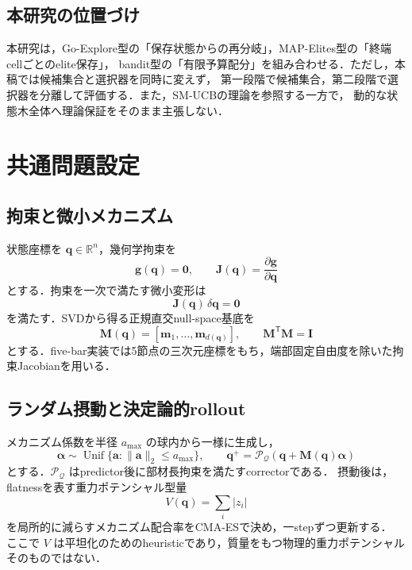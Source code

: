 \documentclass[a4paper,11pt]{ltjsarticle}
\begin{document}
\subsection{本研究の位置づけ}

本研究は，Go-Explore型の「保存状態からの再分岐」，MAP-Elites型の「終端cellごとのelite保存」，
bandit型の「有限予算配分」を組み合わせる．ただし，本稿では候補集合と選択器を同時に変えず，
第一段階で候補集合，第二段階で選択器を分離して評価する．また，SM-UCBの理論を参照する一方で，
動的な状態木全体へ理論保証をそのまま主張しない．

\section{共通問題設定}
\label{sec:formulation}

\subsection{拘束と微小メカニズム}

状態座標を \(\bm q\in\mathbb R^n\)，幾何学拘束を
\begin{equation}
  \bm g(\bm q)=\bm 0,
  \qquad
  \bm J(\bm q)=\frac{\partial\bm g}{\partial\bm q}
\end{equation}
とする．拘束を一次で満たす微小変形は
\begin{equation}
  \bm J(\bm q)\,\delta\bm q=\bm 0
\end{equation}
を満たす．SVDから得る正規直交null-space基底を
\begin{equation}
  \bm M(\bm q)
  =[\bm m_1,\ldots,\bm m_{d(\bm q)}],
  \qquad \bm M^\mathsf T\bm M=\bm I
\end{equation}
とする．five-bar実装では5節点の三次元座標をもち，端部固定自由度を除いた拘束Jacobianを用いる．

\subsection{ランダム摂動と決定論的rollout}

メカニズム係数を半径 \(a_{\max}\) の球内から一様に生成し，
\begin{equation}
  \bm\alpha\sim\operatorname{Unif}
  \{\bm a:\|\bm a\|_2\le a_{\max}\},
  \qquad
  \bm q^+=\mathcal P_{\mathcal Q}
  (\bm q+\bm M(\bm q)\bm\alpha)
  \label{eq:random-perturbation}
\end{equation}
とする．\(\mathcal P_{\mathcal Q}\) はpredictor後に部材長拘束を満たすcorrectorである．
摂動後は，flatnessを表す重力ポテンシャル型量
\begin{equation}
  V(\bm q)=\sum_i |z_i|
\end{equation}
を局所的に減らすメカニズム配合率をCMA-ESで決め，一stepずつ更新する．
ここで \(V\) は平坦化のためのheuristicであり，質量をもつ物理的重力ポテンシャルそのものではない．
\end{document}
